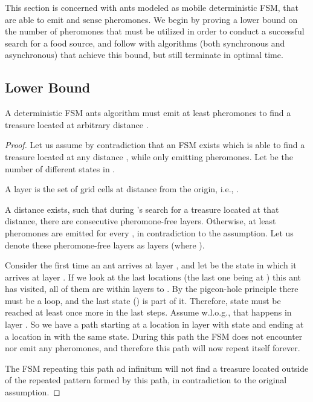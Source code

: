 

This section is concerned with ants modeled as mobile deterministic FSM, that are able to emit and
sense pheromones. We begin by proving a lower bound on the number of pheromones 
that must be utilized in order to conduct a successful search for a food source, 
and follow with algorithms (both synchronous and asynchronous) that achieve this bound, 
but still terminate in optimal time.

\subsection{Lower Bound}

\begin{theorem}\label{thm:fsm}
A deterministic FSM ants algorithm must emit at least  pheromones to find a treasure located at arbitrary distance .
\end{theorem}

\begin{proof}
Let us assume by contradiction that an FSM  exists which is able to find a
 treasure located at any distance , while only emitting  pheromones.
Let  be the number of different states in .

\begin{definition}[Layer]
A layer  is the set of grid cells  at distance  from
the origin, i.e., .
\end{definition}

A distance  exists, such that during 's search for a 
treasure located at that distance, there are  consecutive pheromone-free layers.
 Otherwise, at least
 pheromones are emitted for every , in contradiction to the assumption. Let us denote these pheromone-free layers as layers  
(where ).

Consider the first time an ant arrives at layer , and let  be the state in which it arrives at layer .
If we look
at the last  locations (the last one being at ) this ant has visited, all of them are within layers  to
. By the pigeon-hole principle there must be a loop, and the last state () is part of it.
Therefore, state  must be reached at least once more in the last  steps. Assume
w.l.o.g., that happens in layer . So we have a path starting at a location in layer  with state
  and ending
 at a location in  with the same state. During this path the FSM does not encounter nor emit any
pheromones, and therefore this path will now repeat itself forever.

The FSM repeating this path ad infinitum will not find a treasure located outside
of the repeated pattern formed by this path, in contradiction to the original assumption.
\end{proof}

